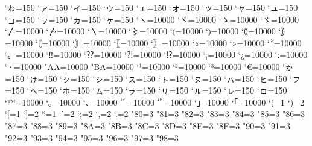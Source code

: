 \prebreakpenalty`ゎ=150%
\prebreakpenalty`ァ=150
\prebreakpenalty`ィ=150
\prebreakpenalty`ゥ=150
\prebreakpenalty`ェ=150
\prebreakpenalty`ォ=150
\prebreakpenalty`ッ=150
\prebreakpenalty`ャ=150
\prebreakpenalty`ュ=150
\prebreakpenalty`ョ=150
\prebreakpenalty`ヮ=150%
\prebreakpenalty`ヵ=150%
\prebreakpenalty`ヶ=150%
\prebreakpenalty`ヽ=10000
\prebreakpenalty`ヾ=10000
\prebreakpenalty`ゝ=10000
\prebreakpenalty`ゞ=10000
\prebreakpenalty`〳=10000
\prebreakpenalty`〴=10000
\prebreakpenalty`〵=10000
\prebreakpenalty`〻=10000
\postbreakpenalty`⦅=10000
\prebreakpenalty`⦆=10000
\postbreakpenalty`｟=10000
\prebreakpenalty`｠=10000
\postbreakpenalty`〘=10000
\prebreakpenalty`〙=10000
\postbreakpenalty`〖=10000
\prebreakpenalty`〗=10000
\postbreakpenalty`«=10000
\prebreakpenalty`»=10000
\postbreakpenalty`〝=10000
\prebreakpenalty`〟=10000
\prebreakpenalty`‼=10000
\prebreakpenalty`⁇=10000
\prebreakpenalty`⁈=10000
\prebreakpenalty`⁉=10000
\postbreakpenalty`¡=10000
\postbreakpenalty`¿=10000
\prebreakpenalty`ː=10000
\prebreakpenalty`·=10000
\prebreakpenalty"AA=10000%
\prebreakpenalty"BA=10000%
\prebreakpenalty`¹=10000
\prebreakpenalty`²=10000
\prebreakpenalty`³=10000
\postbreakpenalty`€=10000
\prebreakpenalty`ゕ=150
\prebreakpenalty`ゖ=150
\prebreakpenalty`ㇰ=150
\prebreakpenalty`ㇱ=150
\prebreakpenalty`ㇲ=150
\prebreakpenalty`ㇳ=150
\prebreakpenalty`ㇴ=150
\prebreakpenalty`ㇵ=150
\prebreakpenalty`ㇶ=150
\prebreakpenalty`ㇷ=150
\prebreakpenalty`ㇸ=150
\prebreakpenalty`ㇹ=150
\prebreakpenalty`ㇺ=150
\prebreakpenalty`ㇻ=150
\prebreakpenalty`ㇼ=150
\prebreakpenalty`ㇽ=150
\prebreakpenalty`ㇾ=150
\prebreakpenalty`ㇿ=150
\prebreakpenalty`™=10000
\prebreakpenalty`｡=10000
\prebreakpenalty`､=10000
\prebreakpenalty`ﾞ=10000
\prebreakpenalty`ﾟ=10000
\prebreakpenalty`｣=10000
\postbreakpenalty`｢=10000
\xspcode`(=1
\xspcode`)=2
\xspcode`[=1
\xspcode`]=2
\xspcode``=1
\xspcode`'=2
\xspcode`;=2
\xspcode`,=2
\xspcode`.=2
\xspcode"80=3
\xspcode"81=3
\xspcode"82=3
\xspcode"83=3
\xspcode"84=3
\xspcode"85=3
\xspcode"86=3
\xspcode"87=3
\xspcode"88=3
\xspcode"89=3
\xspcode"8A=3
\xspcode"8B=3
\xspcode"8C=3
\xspcode"8D=3
\xspcode"8E=3
\xspcode"8F=3
\xspcode"90=3
\xspcode"91=3
\xspcode"92=3
\xspcode"93=3
\xspcode"94=3
\xspcode"95=3
\xspcode"96=3
\xspcode"97=3
\xspcode"98=3
